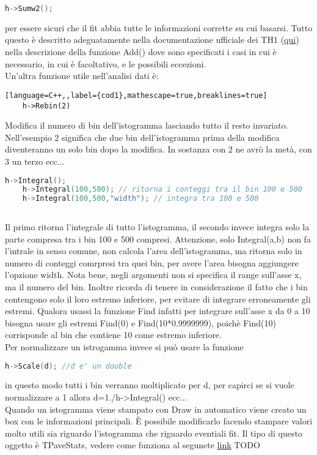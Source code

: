 \begin{lstlisting}[language=C++,label={cod1},mathescape=true,breaklines=true]
	h->Sumw2();
\end{lstlisting}
per essere sicuri che il fit abbia tutte le informazioni corrette su cui basarsi. Tutto questo è descritto adeguatamente nella documentazione ufficiale dei TH1 (\href{https://root.cern.ch/doc/master/classTH1.html}{qui}) nella descrizione della funzione Add() dove sono specificati i casi in cui è necessario, in cui è facoltativo, e le possibili eccezioni.\\
Un'altra funzione utile nell'analisi dati è:
\begin{lstlisting}[language=C++,,label={cod1},mathescape=true,breaklines=true]
	h->Rebin(2)
\end{lstlisting}
Modifica il numero di bin dell'istogramma lasciando tutto il resto invariato. Nell'esempio 2 significa che due bin dell'istogramma prima della modifica diventeranno un solo bin dopo la modifica. In sostanza con 2 ne avrò la metà, con 3 un terzo ecc...
\begin{lstlisting}[language=C++,label={cod1},mathescape=true,breaklines=true]
	h->Integral();
	h->Integral(100,500); // ritorna i conteggi tra il bin 100 e 500
	h->Integral(100,500,"width"); // integra tra 100 e 500
	
\end{lstlisting}
Il primo ritorna l'integrale di tutto l'istogramma, il secondo invece integra solo la parte compresa tra i bin 100 e 500 compresi. Attenzione, solo Integral(a,b) non fa l'intrale in senso comune, non calcola l'area dell'istogramma, ma ritorna solo in numero di conteggi comrpresi tra quei bin, per avere l'area bisogna aggiungere l'opzione width.  Nota bene, negli argomenti non si specifica il range sull'asse x, ma il numero del bin. Inoltre ricorda di tenere in considerazione il fatto che i bin contengono solo il loro estremo inferiore, per evitare di integrare erroneamente gli estremi. Qualora usassi la funzione Find infatti per integrare sull'asse x da 0 a 10 bisogna usare gli estremi Find(0) e Find(10*0.9999999), poichè Find(10) corrisponde al bin che contiene 10 come estremo inferiore.\\
Per normalizzare un istrogamma invece si può usare la funzione
\begin{lstlisting}[language=C++,label={cod1},mathescape=true,breaklines=true]
	h->Scale(d); //d e' un double
\end{lstlisting}
in questo modo tutti i bin verranno moltiplicato per d, per capirci se si vuole normalizzare a 1 allora d=1./h-\textgreater Integral() ecc...\\
Quando un istogramma viene stampato con Draw in automatico viene creato un box con le informazioni principali. È possibile modificarlo facendo stampare valori molto utili sia riguardo l'istogramma che riguardo eventiali fit. Il tipo di questo oggetto è TPaveStats, vedere come funziona al segunete \href{https://root.cern.ch/doc/master/classTPaveStats.html}{link} TODO
